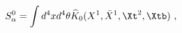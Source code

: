 \begin{equation}
\label{khat}
S^0_{\alpha}=\int d^4xd^4\theta 
\widehat{K}_0(X^1,\bar{X}^{1},\Xt^2,\Xtb) \ ,
\end{equation}

